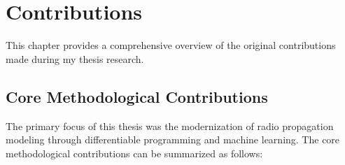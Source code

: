 \chapter{Contributions}

This chapter provides a comprehensive overview of the original contributions made during my thesis research.

\section{Core Methodological Contributions}

The primary focus of this thesis was the modernization of radio propagation modeling through differentiable programming and machine learning. The core methodological contributions can be summarized as follows:

